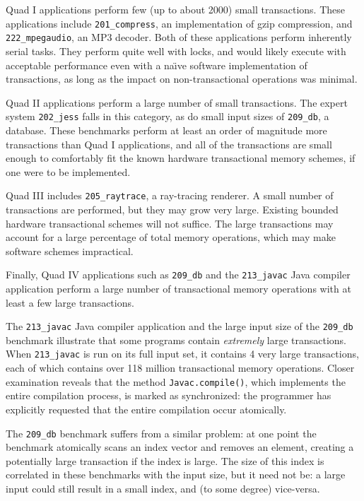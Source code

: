 Quad I applications perform few (up to about 2000) small
transactions.  These applications include \texttt{201\_compress}, an
implementation of gzip compression, and \texttt{222\_mpegaudio}, an
MP3 decoder.  Both of these applications perform inherently serial
tasks.  They perform quite well with locks, and would likely execute
with acceptable performance even with a na\"\i{}ve software
implementation of transactions, as long as the impact on
non-transactional operations was minimal.

Quad II applications perform a large number of small transactions.
The expert system \texttt{202\_jess} falls in this category, as do
small input sizes of \texttt{209\_db}, a database.  These benchmarks
perform at least an order of magnitude more transactions than Quad
I applications, and all of the transactions are small enough to 
comfortably fit the known hardware transactional memory schemes, if
one were to be implemented.

Quad III includes \texttt{205\_raytrace}, a ray-tracing renderer.  A
small number of transactions are performed, but they may grow very
large.  Existing bounded hardware transactional schemes will not
suffice.  The large
transactions may account for a large percentage of total memory
operations, which may make software schemes impractical.

Finally, Quad IV applications such as \texttt{209\_db} and the
\texttt{213\_javac} Java compiler application perform a large number
of transactional memory operations with at least a few large transactions.  

The \texttt{213\_javac} Java compiler application and the large input
size of the \texttt{209\_db} benchmark illustrate that some programs
contain \emph{extremely} large transactions.  When \texttt{213\_javac}
is run on its full input set, it contains 4 very large transactions,
each of which contains over 118 million transactional memory
operations.  Closer
examination reveals that the method \texttt{Javac.compile()}, which
implements the entire compilation process, is marked as synchronized:
the programmer has explicitly requested that the entire compilation
occur atomically.

The \texttt{209\_db} benchmark suffers from a similar problem: at one
point the benchmark atomically scans an index vector and removes an
element, creating a potentially large transaction if the index is
large.  The size of this index is correlated in these benchmarks with
the input size, but it need not be: a large input could still result
in a small index, and (to some degree) vice-versa.

